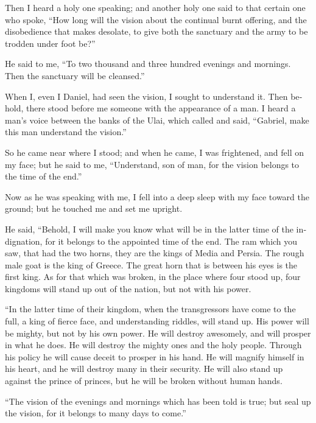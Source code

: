 \begin{paracol}{2}
\begin{otherlanguage}{english}
 Then I heard a holy one speaking; and another holy one
said to that certain one who spoke, ``How long will the vision about the
continual burnt offering, and the disobedience that makes desolate, to
give both the sanctuary and the army to be trodden under foot be?''

 He said to me, ``To two thousand and three hundred
evenings and mornings. Then the sanctuary will be cleansed.''

 When I, even I Daniel, had seen the vision, I sought to
understand it. Then behold, there stood before me someone with the
appearance of a man.  I heard a man's voice between the
banks of the Ulai, which called and said, ``Gabriel, make this man
understand the vision.''

 So he came near where I stood; and when he came, I was
frightened, and fell on my face; but he said to me, ``Understand, son of
man, for the vision belongs to the time of the end.''

 Now as he was speaking with me, I fell into a deep sleep
with my face toward the ground; but he touched me and set me upright.

 He said, ``Behold, I will make you know what will be in
the latter time of the indignation, for it belongs to the appointed time
of the end.  The ram which you saw, that had the two
horns, they are the kings of Media and Persia.  The rough
male goat is the king of Greece. The great horn that is between his eyes
is the first king.  As for that which was broken, in the
place where four stood up, four kingdoms will stand up out of the
nation, but not with his power.

 ``In the latter time of their kingdom, when the
transgressors have come to the full, a king of fierce face, and
understanding riddles, will stand up.  His power will be
mighty, but not by his own power. He will destroy awesomely, and will
prosper in what he does. He will destroy the mighty ones and the holy
people.  Through his policy he will cause deceit to
prosper in his hand. He will magnify himself in his heart, and he will
destroy many in their security. He will also stand up against the prince
of princes, but he will be broken without human hands.

 ``The vision of the evenings and mornings which has been
told is true; but seal up the vision, for it belongs to many days to
come.''


\end{otherlanguage}
\end{paracol}
